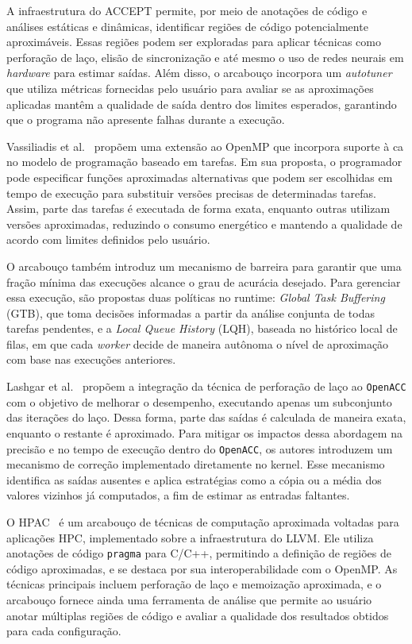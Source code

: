 A infraestrutura do ACCEPT permite, por meio de anotações de código e análises estáticas e dinâmicas, identificar regiões de código potencialmente aproximáveis. Essas regiões podem ser exploradas para aplicar técnicas como perforação de laço, elisão de sincronização e até mesmo o uso de redes neurais em \textit{hardware} para estimar saídas. Além disso, o arcabouço incorpora um \textit{autotuner} que utiliza métricas fornecidas pelo usuário para avaliar se as aproximações aplicadas mantêm a qualidade de saída dentro dos limites esperados, garantindo que o programa não apresente falhas durante a execução.

Vassiliadis et al.~\cite{vassiliadis2015} propõem uma extensão ao OpenMP que incorpora suporte à \gls{ca} no modelo de programação baseado em tarefas. Em sua proposta, o programador pode especificar funções aproximadas alternativas que podem ser escolhidas em tempo de execução para substituir versões precisas de determinadas tarefas. Assim, parte das tarefas é executada de forma exata, enquanto outras utilizam versões aproximadas, reduzindo o consumo energético e mantendo a qualidade de acordo com limites definidos pelo usuário.

O arcabouço também introduz um mecanismo de barreira para garantir que uma fração mínima das execuções alcance o grau de acurácia desejado. Para gerenciar essa execução, são propostas duas políticas no runtime: \textit{Global Task Buffering} (GTB), que toma decisões informadas a partir da análise conjunta de todas tarefas pendentes, e a \textit{Local Queue History} (LQH), baseada no histórico local de filas, em que cada \textit{worker} decide de maneira autônoma o nível de aproximação com base nas execuções anteriores.

Lashgar et al.~\cite{lashgar2018} propõem a integração da técnica de perforação de laço ao \texttt{OpenACC} com o objetivo de melhorar o desempenho, executando apenas um subconjunto das iterações do laço. Dessa forma, parte das saídas é calculada de maneira exata, enquanto o restante é aproximado. Para mitigar os impactos dessa abordagem na precisão e no tempo de execução dentro do \texttt{OpenACC}, os autores introduzem um mecanismo de correção implementado diretamente no kernel. Esse mecanismo identifica as saídas ausentes e aplica estratégias como a cópia ou a média dos valores vizinhos já computados, a fim de estimar as entradas faltantes.

O HPAC~\cite{parasyris2021} é um arcabouço de técnicas de computação aproximada voltadas para aplicações HPC, implementado sobre a infraestrutura do LLVM. Ele utiliza anotações de código \texttt{pragma} para C/C++, permitindo a definição de regiões de código aproximadas, e se destaca por sua interoperabilidade com o OpenMP. As técnicas principais incluem perforação de laço e memoização aproximada, e o arcabouço fornece ainda uma ferramenta de análise que permite ao usuário anotar múltiplas regiões de código e avaliar a qualidade dos resultados obtidos para cada configuração.

